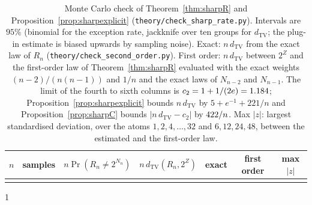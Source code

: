 \documentclass[11pt,a4paper]{article}
\providecommand{\HasSecond}{0}
\theoremstyle{plain}
\theoremstyle{definition}
\theoremstyle{remark}
\begin{document}
\begin{table}[t]
\centering\small
\begin{tabular}{rrccccc}
\toprule
$n$ & samples & $n\Pr(R_n\ne2^{N_n})$ & $n\,d_{\mathrm{TV}}(R_n,2^Z)$ & exact & first order & max $|z|$\\
\midrule
\\
\bottomrule
\end{tabular}
\caption{Monte Carlo check of Theorem~\ref{thm:sharpR} and Proposition~\ref{prop:sharpexplicit} (\texttt{theory/check\_sharp\_rate.py}). Intervals are $95\%$ (binomial for the exception rate, jackknife over ten groups for $d_{\mathrm{TV}}$; the plug-in estimate is biased upwards by sampling noise). Exact: $n\,d_{\mathrm{TV}}$ from the exact law of $R_n$ (\texttt{theory/check\_second\_order.py}). First order: $n\,d_{\mathrm{TV}}$ between $2^Z$ and the first-order law of Theorem~\ref{thm:sharpR} evaluated with the exact weights $(n-2)/(n(n-1))$ and $1/n$ and the exact laws of $N_{n-2}$ and $N_{n-1}$. The limit of the fourth to sixth columns is $c_2=1+1/(2e)=1.184$; Proposition~\ref{prop:sharpexplicit} bounds $n\,d_{\mathrm{TV}}$ by $5+e^{-1}+221/n$ and Proposition~\ref{prop:sharpC} bounds $|n\,d_{\mathrm{TV}}-c_2|$ by $422/n$. Max $|z|$: largest standardised deviation, over the atoms $1,2,4,\dots,32$ and $6,12,24,48$, between the estimated and the first-order law.}
\label{tab:sharp}
\end{table}
\fi

\if\HasSecond1
\end{document}
